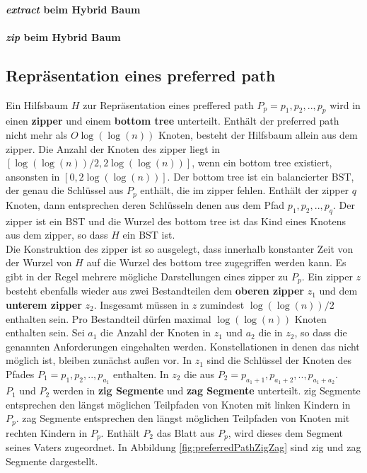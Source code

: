 \documentclass[a4paper,12pt]{article}
\begin{document}
\paragraph{\textit{extract} beim Hybrid Baum} 
\paragraph{\textit{zip} beim Hybrid Baum} 
\subsection{Repräsentation eines preferred path}
Ein Hilfsbaum $H$ zur Repräsentation eines preffered path $P_p = p_1,p_2,..,p_p$ wird in einen \textbf{zipper} und einem \textbf{bottom tree} unterteilt. Enthält der preferred path nicht mehr als $O\log\left(\log\left(n\right)\right)$ Knoten, besteht der Hilfsbaum allein aus dem zipper. Die Anzahl der Knoten des zipper liegt in \\$\left[\log\left(\log\left(n\right)\right) / 2, 2 \log\left(\log\left(n\right)\right)  \right] $, wenn ein bottom tree existiert, ansonsten in $\left[0, 2 \log\left(\log\left(n\right)\right)  \right] $. Der bottom tree ist ein balancierter BST, der genau die Schlüssel aus $P_p$ enthält, die im zipper fehlen. Enthält der zipper $q$ Knoten, dann entsprechen deren Schlüsseln denen aus dem Pfad $p_1, p_2,..,p_q$. Der zipper ist ein BST und die Wurzel des bottom tree ist das Kind eines Knotens aus dem zipper, so dass $H$ ein BST ist. \\
 Die Konstruktion des zipper ist so ausgelegt, dass innerhalb konstanter Zeit von der Wurzel von $H$ auf die Wurzel des bottom tree zugegriffen werden kann. Es gibt in der Regel mehrere mögliche Darstellungen eines zipper zu $P_p$. Ein zipper $z$ besteht ebenfalls wieder aus zwei Bestandteilen dem \textbf{oberen zipper} $z_1$  und dem \textbf{unterem zipper} $z_2$. Insgesamt müssen in $z$ zumindest  $\log\left(\log\left(n\right)\right) / 2$ enthalten sein. Pro Bestandteil dürfen maximal $\log\left(\log\left(n\right)\right)$ Knoten enthalten sein. Sei $a_1$ die Anzahl der Knoten in $z_1$ und $a_2$ die in $z_2$, so dass die genannten Anforderungen eingehalten werden. Konstellationen in denen das nicht möglich ist, bleiben zunächst außen vor. In $z_1$ sind die Schlüssel der Knoten des Pfades $P_1 = p_1, p_2,.., p_{a_1}$ enthalten. In $z_2$ die aus $P_2 = p_{a_1 + 1}, p_{a_1 + 2},..,p_{a_1 + a_2} $. \\
 $P_1$ und $P_2$ werden in \textbf{zig Segmente} und \textbf{zag Segmente} unterteilt. zig Segmente entsprechen den längst möglichen Teilpfaden von Knoten mit linken Kindern in $P_p$. zag Segmente entsprechen den längst möglichen Teilpfaden von Knoten mit rechten Kindern in $P_p$. Enthält $P_2$ das Blatt aus $P_p$, wird dieses dem Segment seines Vaters zugeordnet. In Abbildung  \ref{fig:preferredPathZigZag} sind zig und zag Segmente dargestellt.
\end{document}
